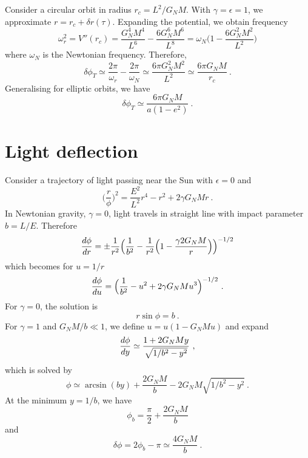     Consider a circular orbit in radius $r_c = L^2 / G_N M$. With $\gamma = \epsilon =1$, we approximate $r = r_c + \delta r(\tau)$. Expanding the potential, we obtain frequency
    \begin{equation*}
        \omega_r^2 = V''(r_c) = \frac{G_N^4 M^4}{L^6} - \frac{6 G_N^6 M^6}{L^8} = \omega_N \Big ( 1 - \frac{6 G_N^2 M^2}{L^2} \Big)
    \end{equation*}
    where $\omega_N$ is the Newtonian frequency. Therefore, 
    \begin{equation*}
        \delta \phi_T \simeq \frac{2\pi}{\omega_r} - \frac{2\pi}{\omega_N} \simeq \frac{6 \pi G_N^2 M^2}{L^2} \simeq \frac{6 \pi G_N M}{r_c} ~.
    \end{equation*}
    Generalising for elliptic orbits, we have 
    \begin{equation*}
        \delta \phi_T \simeq \frac{6 \pi G_N M}{a (1 - e^2)} ~.
    \end{equation*}

\section{Light deflection}

    Consider a trajectory of light passing near the Sun with $\epsilon = 0$ and 
    \begin{equation*}
        \Big ( \frac{r}{\phi} \Big )^2 = \frac{E^2}{L^2} r^4 - r^2 + 2 \gamma G_N M r ~.
    \end{equation*}
    In Newtonian gravity, $\gamma = 0$, light travels in straight line with impact parameter $b = L / E$. Therefore 
    \begin{equation*}
        \frac{d\phi}{dr} = \pm \frac{1}{r^2} \Big ( \frac{1}{b^2} - \frac{1}{r^2} \Big ( 1 - \frac{\gamma 2 G_N M }{r} \Big )\Big )^{-1/2}
    \end{equation*}
    which becomes for $u = 1 / r$ 
    \begin{equation*}
        \frac{d\phi}{du} = \Big ( \frac{1}{b^2} - u^2 + 2 \gamma G_N M u^3 \Big )^{-1/2} ~.
    \end{equation*}
    For $\gamma = 0$, the solution is 
    \begin{equation*}
        r \sin \phi = b ~.
    \end{equation*}
    For $\gamma = 1$ and $G_N M /b \ll 1$, we define $u = u (1 - G_N M u)$ and expand 
    \begin{equation*}
        \frac{d\phi}{dy} \simeq \frac{1 + 2 G_N M y}{\sqrt{1 / b^2 - y^2}} ~,
    \end{equation*}
    which is solved by 
    \begin{equation*}
        \phi \simeq \arcsin (by) + \frac{2 G_N M}{b} - 2 G_N M \sqrt{1 / b^2 - y^2} ~.
    \end{equation*}
    At the minimum $y = 1 / b$, we have 
    \begin{equation*}
        \phi_b = \frac{\pi}{2} + \frac{2 G_N M}{b} 
    \end{equation*}
    and 
    \begin{equation*}
        \delta \phi = 2 \phi_b - \pi \simeq \frac{4 G_N M}{b} ~.
    \end{equation*}

